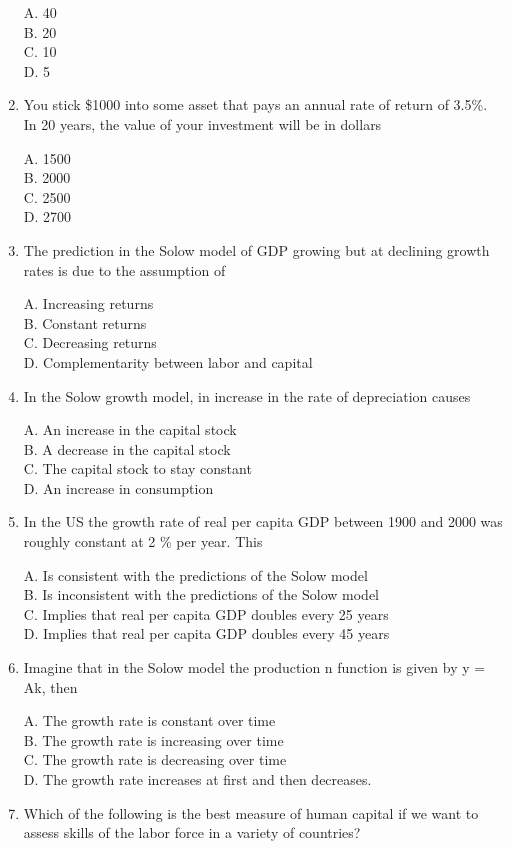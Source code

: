 \documentclass[
]{book}
\begin{document}
\begin{enumerate}
  A. 40\\
  B. 20\\
  C. 10\\
  D. 5
\item
  You stick \$1000 into some asset that pays an annual rate of return of 3.5\%. In 20 years, the value of your investment will be in dollars

  A. 1500\\
  B. 2000\\
  C. 2500\\
  D. 2700
\item
  The prediction in the Solow model of GDP growing but at declining growth rates is due to the assumption of

  A. Increasing returns\\
  B. Constant returns\\
  C. Decreasing returns\\
  D. Complementarity between labor and capital
\item
  In the Solow growth model, in increase in the rate of depreciation causes

  A. An increase in the capital stock\\
  B. A decrease in the capital stock\\
  C. The capital stock to stay constant\\
  D. An increase in consumption
\item
  In the US the growth rate of real per capita GDP between 1900 and 2000 was roughly constant at 2 \% per year. This

  A. Is consistent with the predictions of the Solow model\\
  B. Is inconsistent with the predictions of the Solow model\\
  C. Implies that real per capita GDP doubles every 25 years\\
  D. Implies that real per capita GDP doubles every 45 years
\item
  Imagine that in the Solow model the production n function is given by y = Ak, then

  A. The growth rate is constant over time\\
  B. The growth rate is increasing over time\\
  C. The growth rate is decreasing over time\\
  D. The growth rate increases at first and then decreases.
\item
  Which of the following is the best measure of human capital if we want to assess skills of the labor force in a variety of countries?


\end{enumerate}
\end{document}
